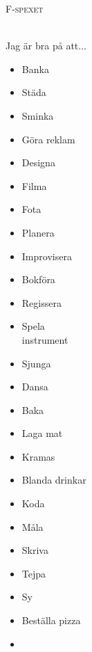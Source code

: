 \begin{multicols}{2}
    \columnbreak
    
    {\centerline{\Huge \textsc{F-spexet}}}\leavevmode\\
    Jag är bra på att...
    \renewcommand\labelitemi{$\square$}
    \renewcommand\labelitemii{$\square$} 
    \footnotesize   
    \setlength{\columnsep}{0.1cm}
    \begin{multicols}{2}
        \begin{itemize}
            \setlength{\itemindent}{-1.5em}
            \setlength\itemsep{1pt}
            \item Banka
            \item Städa
            \item Sminka
            \item Göra reklam
            \item Designa
            \item Filma
            \item Fota
            \item Planera
            \item Improvisera
            \item Bokföra
            \item Regissera
            \item Spela\\ \hspace{-1.5em}instrument\\\hspace{-1.5em}\underline{\hspace{1.5cm}}
            \columnbreak
            \item Sjunga
            \item Dansa
            \item Baka
            \item Laga mat
            \item Kramas
            \item Blanda drinkar
            \item Koda
            \item Måla
            \item Skriva
            \item Tejpa
            \item Sy
            \item Beställa pizza
            \item \underline{\hspace{1.5cm}}
        \end{itemize}  
    \end{multicols}

\end{multicols}
